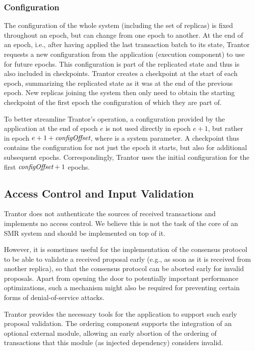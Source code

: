 \documentclass{article}
\begin{document}
\subsubsection{Configuration}
\label{sec:configuration}

The configuration of the whole system (including the set of replicas) is fixed throughout an epoch,
but can change from one epoch to another.
At the end of an epoch, i.e., after having applied the last transaction batch to its state,
Trantor requests a new configuration from the application (execution component) to use for future epochs.
This configuration is part of the replicated state and thus is also included in checkpoints.
Trantor creates a checkpoint at the start of each epoch,
summarizing the replicated state as it was at the end of the previous epoch.
New replicas joining the system then only need to obtain the starting checkpoint
of the first epoch the configuration of which they are part of.

To better streamline Trantor’s operation,
a configuration provided by the application at the end of epoch $e$ is not used directly in epoch $e+1$,
but rather in epoch $e+1+\textit{configOffset}$, where  is a system parameter.
A checkpoint thus contains the configuration for not just the epoch it starts,
but also for  additional subsequent epochs.
Correspondingly, Trantor uses the initial configuration for the first $\textit{configOffset}+1$ epochs.

\subsection{Access Control and Input Validation}
\label{sec:access-control-input-validation}

Trantor does not authenticate the sources of received transactions and implements no access control.
We believe this is not the task of the core of an SMR system and should be implemented on top of it.

However, it is sometimes useful for the implementation of the consensus protocol to be able to validate a received proposal early
(e.g., as soon as it is received from another replica), so that the consensus protocol can be aborted early for invalid proposals.
Apart from opening the door to potentially important performance optimizations,
such a mechanism might also be required for preventing certain forms of denial-of-service attacks.

Trantor provides the necessary tools for the application to support such early proposal validation.
The ordering component supports the integration of an optional external  module,
allowing an early abortion of the ordering of transactions that this module (as injected dependency) considers invalid.
\end{document}
